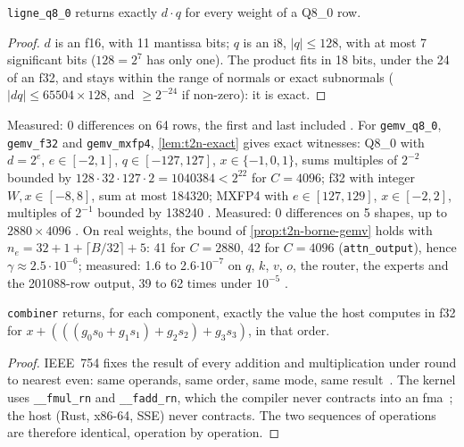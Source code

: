\begin{proposition}\label{prop:t2n-ligne}
\texttt{ligne\_q8\_0} returns exactly $d \cdot q$ for every weight of a Q8\_0 row.
\end{proposition}

\begin{proof}
$d$ is an f16, with 11 mantissa bits; $q$ is an i8, $|q| \le 128$, with at most 7 significant bits ($128 = 2^7$ has only one). The product fits in 18 bits, under the 24 of an f32, and stays within the range of normals or exact subnormals ($|d q| \le \num{65504} \times 128$, and $\ge 2^{-24}$ if non-zero): it is exact.
\end{proof}

Measured: 0 differences on 64 rows, the first and last included \mes. For \texttt{gemv\_q8\_0}, \texttt{gemv\_f32} and \texttt{gemv\_mxfp4}, \cref{lem:t2n-exact} gives exact witnesses: Q8\_0 with $d = 2^e$, $e \in [-2, 1]$, $q \in [-127, 127]$, $x \in \{-1, 0, 1\}$, sums multiples of $2^{-2}$ bounded by $128 \cdot 32 \cdot 127 \cdot 2 = \num{1040384} < 2^{22}$ for $C = \num{4096}$; f32 with integer $W, x \in [-8, 8]$, sum at most \num{184320}; MXFP4 with $e \in [127, 129]$, $x \in [-2, 2]$, multiples of $2^{-1}$ bounded by \num{138240} \calc. Measured: 0 differences on 5 shapes, up to $\num{2880} \times \num{4096}$ \mes. On real weights, the bound of \cref{prop:t2n-borne-gemv} holds with $n_e = 32 + 1 + \lceil B/32 \rceil + 5$: 41 for $C = \num{2880}$, 42 for $C = \num{4096}$ (\texttt{attn\_output}), hence $\gamma \approx 2.5\cdot10^{-6}$; measured: 1.6 to 2.6$\cdot10^{-7}$ on $q$, $k$, $v$, $o$, the router, the experts and the \num{201088}-row output, 39 to 62 times under $10^{-5}$ \mes.

\begin{proposition}\label{prop:t2n-combiner}
\texttt{combiner} returns, for each component, exactly the value the host computes in f32 for $x + (((g_0 s_0 + g_1 s_1) + g_2 s_2) + g_3 s_3)$, in that order.
\end{proposition}

\begin{proof}
IEEE~754 fixes the result of every addition and multiplication under round to nearest even: same operands, same order, same mode, same result~\cite{ieee754-2019}. The kernel uses \texttt{\_\_fmul\_rn} and \texttt{\_\_fadd\_rn}, which the compiler never contracts into an fma~\cite{nvidia2026intrinseques}; the host (Rust, x86-64, SSE) never contracts. The two sequences of operations are therefore identical, operation by operation.
\end{proof}


